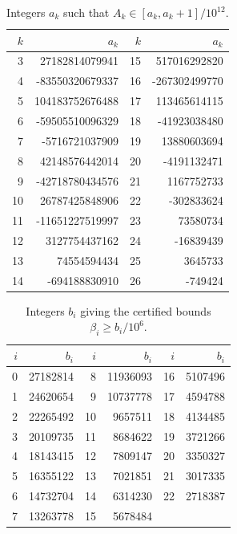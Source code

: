 \documentclass[11pt]{article}
\begin{document}
\begin{table}[htbp]
\centering
\small
\caption{Integers $a_k$ such that $A_k\in[a_k,a_k+1]/10^{12}$.}\label{tab:A}
\begin{tabular}{rr@{\qquad}rr}
\toprule
$k$ & $a_k$ & $k$ & $a_k$ \\
\midrule
3 & 27182814079941 & 15 & 517016292820 \\
4 & -83550320679337 & 16 & -267302499770 \\
5 & 104183752676488 & 17 & 113465614115 \\
6 & -59505510096329 & 18 & -41923038480 \\
7 & -5716721037909 & 19 & 13880603694 \\
8 & 42148576442014 & 20 & -4191132471 \\
9 & -42718780434576 & 21 & 1167752733 \\
10 & 26787425848906 & 22 & -302833624 \\
11 & -11651227519997 & 23 & 73580734 \\
12 & 3127754437162 & 24 & -16839439 \\
13 & 74554594434 & 25 & 3645733 \\
14 & -694188830910 & 26 & -749424 \\
\bottomrule
\end{tabular}
\end{table}

\begin{table}[htbp]
\centering
\small
\caption{Integers $b_i$ giving the certified bounds $\beta_i\ge b_i/10^6$.}\label{tab:beta}
\begin{tabular}{rr@{\qquad}rr@{\qquad}rr}
\toprule
$i$ & $b_i$ & $i$ & $b_i$ & $i$ & $b_i$ \\
\midrule
0 & 27182814 & 8 & 11936093 & 16 & 5107496 \\
1 & 24620654 & 9 & 10737778 & 17 & 4594788 \\
2 & 22265492 & 10 & 9657511 & 18 & 4134485 \\
3 & 20109735 & 11 & 8684622 & 19 & 3721266 \\
4 & 18143415 & 12 & 7809147 & 20 & 3350327 \\
5 & 16355122 & 13 & 7021851 & 21 & 3017335 \\
6 & 14732704 & 14 & 6314230 & 22 & 2718387 \\
7 & 13263778 & 15 & 5678484 &  &  \\
\bottomrule
\end{tabular}
\end{table}

\clearpage


\end{document}
